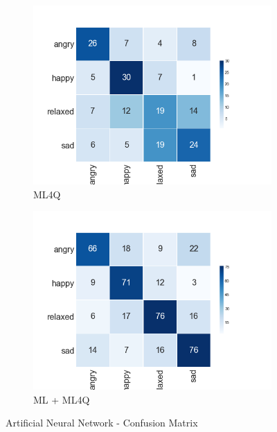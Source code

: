 \begin{figure}[H]
  \centering
  \begin{subfigure}[b]{0.49\linewidth}
    \includegraphics[width=\linewidth]{./chapters/chapter4/images/4Q/CM_ANN.png}
    \caption{ML4Q}
  \end{subfigure}
  \begin{subfigure}[b]{0.49\linewidth}
   \includegraphics[width=\linewidth]{./chapters/chapter4/images/join/CM_ANN.png}
    \caption{ML + ML4Q}
  \end{subfigure}
  \caption{Artificial Neural Network - Confusion Matrix}
  \label{fig:ann}
\end{figure}

